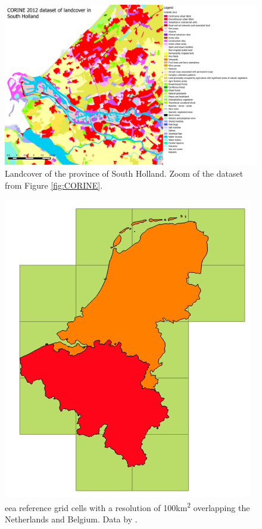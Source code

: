 \begin{figure}[!h]
	\centering
	\includegraphics[width=1\linewidth]{figs/CORINE_NL_BE_color_zoom.PDF}
	\caption{Landcover of the province of South Holland. Zoom of the dataset from Figure \ref{fig:CORINE}.}
	\label{fig:CORINEZOOM}
\end{figure}

\begin{figure}[!h]
	\centering
	\includegraphics[width=0.7\linewidth]{figs/EEA100km.png}
	\caption{\ac{eea} reference grid cells with a resolution of 100km\textsuperscript{2} overlapping the Netherlands and Belgium. Data by \cite{DATA:EEA}.}
	\label{fig:100KM}
\end{figure}

